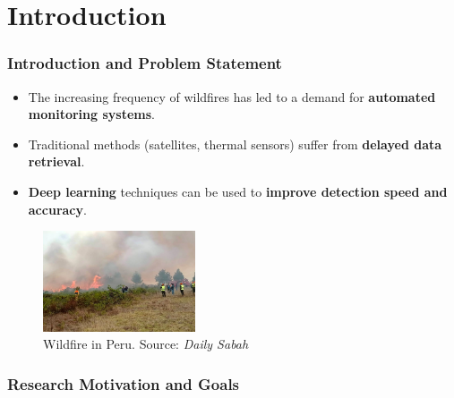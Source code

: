 \section{Introduction}
\label{sec:intro}

    \begin{frame}
    \frametitle{Introduction and Problem Statement}
    \begin{itemize}
        \item The increasing frequency of wildfires has led to a demand for \textbf{automated monitoring systems}.
        \item Traditional methods (satellites, thermal sensors) suffer from \textbf{delayed data retrieval}.
        \item \textbf{Deep learning} techniques can be used to \textbf{improve detection speed and accuracy}.
    \end{itemize}

    \begin{figure}
        \centering
        \includegraphics[width=0.4\textwidth]{images/wildfire}
        \caption{Wildfire in Peru. Source: \textit{Daily Sabah}}
        \label{fig:wildfire}
    \end{figure}
\end{frame}

\begin{frame}
    \frametitle{Research Motivation and Goals}
\end{frame}